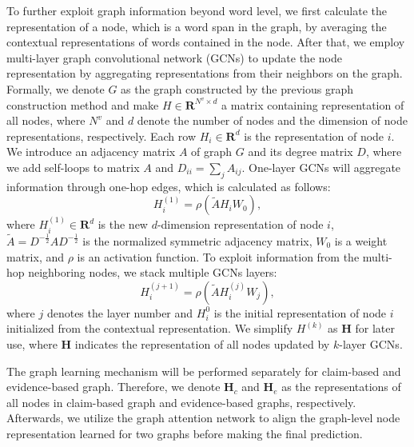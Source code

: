 \documentclass[11pt,a4paper]{article}
\begin{document}
To further exploit graph information beyond word level, we first calculate the representation of a node, which is a word span in the graph, by averaging the contextual representations of words contained in the node.
After that, we employ multi-layer graph convolutional network (GCNs) \cite{kipf2016semi} to update the node representation by aggregating representations from their neighbors on the graph.
Formally, we denote $G$ as the graph constructed by the previous graph construction method and make $H \in \bm{R}^{N^v \times d}$ a matrix containing representation of all nodes, where $N^v$ and $d$ denote the number of nodes and the dimension of node representations, respectively. 
Each row $H_i \in \bm{R}^d$ is the representation of node $i$. 
We introduce an adjacency matrix $A$ of graph $G$ and its degree matrix $D$, where we add self-loops to matrix $A$ and $D_{ii}= \sum_{j} A_{ij}$. 
One-layer GCNs will aggregate information through one-hop edges, which is calculated as follows: 
\begin{equation}
H^{(1)}_i=\rho(\widetilde{A}H_iW_0),
\end{equation}
where $H^{(1)}_i \in \bm{R}^d$ is the new $d$-dimension representation of node $i$, $\widetilde{A}=D^{-\frac{1}{2}}AD^{-\frac{1}{2}}$ is the normalized symmetric adjacency matrix, $W_0$ is a weight matrix, and $\rho$ is an activation function. 
To exploit information from the multi-hop neighboring nodes, we stack multiple GCNs layers:
\begin{equation}
H^{(j+1)}_i=\rho(\widetilde{A}H_i^{(j)}W_j),
\end{equation}
where $j$ denotes the layer number and $H^0_i$ is the initial representation of node $i$ initialized from the contextual representation. We simplify $H^{(k)}$ as $\bm{H}$ for later use, where $\bm{H}$ indicates the representation of all nodes updated by $k$-layer GCNs.

The graph learning mechanism will be performed separately for claim-based and evidence-based graph. 
Therefore, we denote $\bm{H}_c$ and $\bm{H}_e$ as the representations of all nodes in claim-based graph and evidence-based graphs, respectively. 
Afterwards, we utilize the graph attention network to align the graph-level node representation learned for two graphs before making the final prediction.
\end{document}
